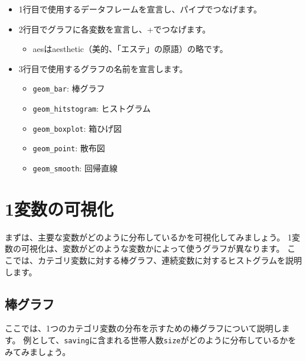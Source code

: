 \documentclass[]{book}
\newenvironment{Shaded}{\begin{snugshade}}{\end{snugshade}}
\newcommand{\KeywordTok}[1]{\textcolor[rgb]{0.13,0.29,0.53}{\textbf{#1}}}
\newcommand{\DataTypeTok}[1]{\textcolor[rgb]{0.13,0.29,0.53}{#1}}
\newcommand{\StringTok}[1]{\textcolor[rgb]{0.31,0.60,0.02}{#1}}
\newcommand{\CommentTok}[1]{\textcolor[rgb]{0.56,0.35,0.01}{\textit{#1}}}
\newcommand{\OperatorTok}[1]{\textcolor[rgb]{0.81,0.36,0.00}{\textbf{#1}}}
\newcommand{\NormalTok}[1]{#1}
\providecommand{\tightlist}{%
  \setlength{\itemsep}{0pt}\setlength{\parskip}{0pt}}
\begin{document}
\begin{itemize}
\tightlist
\item
  1行目で使用するデータフレームを宣言し、パイプでつなげます。
\item
  2行目でグラフに各変数を宣言し、+でつなげます。

  \begin{itemize}
  \tightlist
  \item
    aesはaesthetic（美的、「エステ」の原語）の略です。
  \end{itemize}
\item
  3行目で使用するグラフの名前を宣言します。

  \begin{itemize}
  \tightlist
  \item
    \texttt{geom\_bar}: 棒グラフ
  \item
    \texttt{geom\_hitstogram}: ヒストグラム
  \item
    \texttt{geom\_boxplot}: 箱ひげ図
  \item
    \texttt{geom\_point}: 散布図
  \item
    \texttt{geom\_smooth}: 回帰直線
  \end{itemize}
\end{itemize}

\section{1変数の可視化}\label{ux5909ux6570ux306eux53efux8996ux5316}

まずは、主要な変数がどのように分布しているかを可視化してみましょう。
1変数の可視化は、変数がどのような変数かによって使うグラフが異なります。
ここでは、カテゴリ変数に対する棒グラフ、連続変数に対するヒストグラムを説明します。

\subsection{棒グラフ}\label{ux68d2ux30b0ux30e9ux30d5}

ここでは、1つのカテゴリ変数の分布を示すための棒グラフについて説明します。
例として、\texttt{saving}に含まれる世帯人数\texttt{size}がどのように分布しているかをみてみましょう。

\begin{Shaded}
\end{Shaded}
\end{document}
